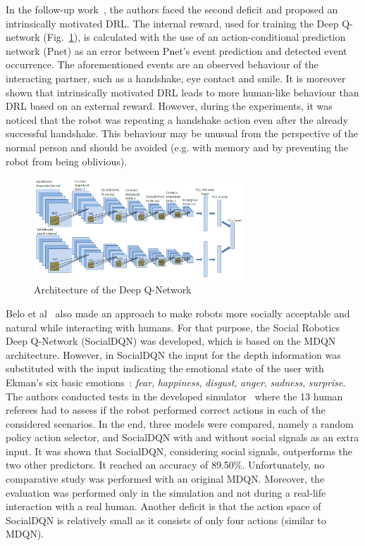 \documentclass[thesis]{mas_proposal}
\begin{document}
In the follow-up work~\cite{Qureshi2018}, the authors faced the second deficit and proposed an intrinsically motivated DRL. The internal reward, used for training the Deep Q-network (Fig.~\ref{fig:mdqn}), is calculated with the use of an action-conditional prediction network (Pnet) as an error between Pnet's event prediction and detected event occurrence. The aforementioned events are an observed behaviour of the interacting partner, such as a handshake, eye contact and smile. It is moreover shown that intrinsically motivated DRL leads to more human-like behaviour than DRL based on an external reward. However, during the experiments, it was noticed that the robot was repeating a handshake action even after the already successful handshake. This behaviour may be unusual from the perspective of the normal person and should be avoided (e.g. with memory and by preventing the robot from being oblivious).

\begin{figure}[htb!]
	\centering
	\includegraphics[width=0.7\textwidth]{images/architecture/mdqn.png}
	\caption{Architecture of the Deep Q-Network~\cite{Qureshi2018}}
	\label{fig:mdqn}
\end{figure}

Belo et al~\cite{Belo2022} also made an approach to make robots more socially acceptable and natural while interacting with humans. For that purpose, the Social Robotics Deep Q-Network (SocialDQN) was developed, which is based on the MDQN architecture. However, in SocialDQN the input for the depth information was substituted with the input indicating the emotional state of the user with Ekman's six basic emotions~\cite{ekman1971constants}: \emph{fear}, \emph{happiness}, \emph{disgust}, \emph{anger}, \emph{sadness}, \emph{surprise}. The authors conducted tests in the developed simulator~\cite{Belo2021} where the 13 human referees had to assess if the robot performed correct actions in each of the considered scenarios. In the end, three models were compared, namely a random policy action selector, and SocialDQN with and without social signals as an extra input. It was shown that SocialDQN, considering social signals, outperforms the two other predictors. It reached an accuracy of 89.50\%. Unfortunately, no comparative study was performed with an original MDQN. Moreover, the evaluation was performed only in the simulation and not during a real-life interaction with a real human. Another deficit is that the action space of SocialDQN is relatively small as it consists of only four actions (similar to MDQN).
 
\end{document}
